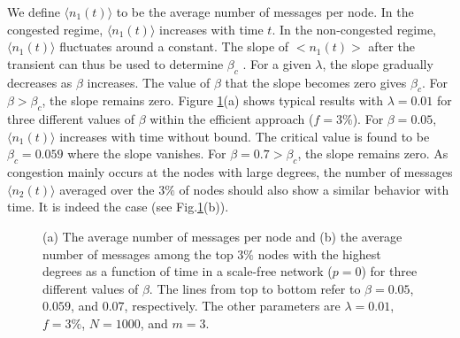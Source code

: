 \documentclass[aps,prl,twocolumn,superscriptaddress,showpacs]{revtex4}
\begin{document}
We define $\langle n_{1}(t) \rangle$ to be the average number of
messages per node.  In the congested regime, $\langle n_{1}(t)
\rangle$ increases with time $t$.  In the non-congested regime,
$\langle n_{1}(t) \rangle$ fluctuates around a constant. The
slope of $<n_1(t)>$ after the transient can thus be used to
determine $\beta_{c}$
\cite{arenas3:2003,moreno2:2004}. For a given $\lambda$, the
slope gradually decreases as $\beta$ increases.  The value of
$\beta$ that the slope becomes zero gives $\beta_{c}$. For
$\beta>\beta_c$, the slope remains zero.  Figure \ref{fig3}(a)
shows typical results with $\lambda = 0.01$ for three different
values of $\beta$ within the efficient approach ($f = 3\%$).  For
$\beta = 0.05$, $\langle n_{1}(t) \rangle$ increases with time
without bound.  The critical value is found to be $\beta_{c} =
0.059$ where the slope vanishes.  For $\beta = 0.7 > \beta_{c}$,
the slope remains zero.  As congestion mainly occurs at the nodes
with large degrees, the number of messages $\langle n_{2}(t)
\rangle$ averaged over the $3\%$ of nodes should also show a
similar behavior with time.  It is indeed the case (see
Fig.\ref{fig3}(b)).

\begin{figure}
\begin{center}
 \caption{(a) The
average number of messages per node and (b) the average number of
messages among the top $3\%$ nodes with the highest degrees as a
function of time in a scale-free network ($p=0$) for three
different values of $\beta$.  The lines from top to bottom refer
to $\beta = 0.05$, $0.059$, and $0.07$, respectively. The other
parameters are $\lambda=0.01$, $f=3\%$, $N=1000$, and $m=3$.}
\label{fig3}
\end{center}
\end{figure}
\end{document}
